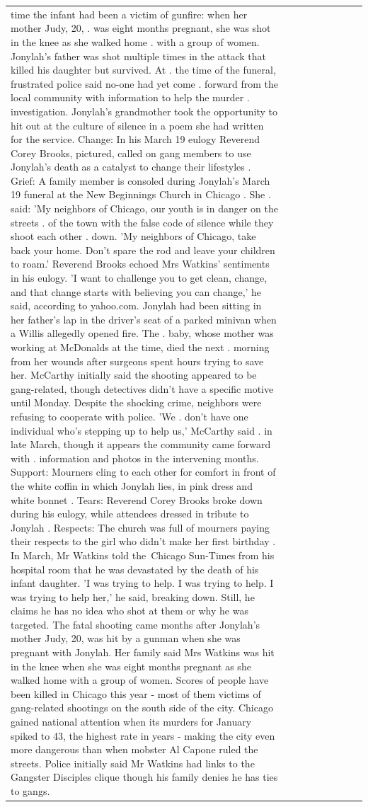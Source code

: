 \begin{table}[H]
\begin{tabular}{lllrlllll}
time the infant had been a victim of gunfire: when her mother Judy, 20, . was eight months pregnant, she was shot in the knee as she walked home . with a group of women. Jonylah's father was shot multiple times in the attack that killed his daughter but survived. At . the time of the funeral, frustrated police said no-one had yet come . forward from the local community with information to help the murder . investigation. Jonylah's grandmother took the opportunity to hit out at the culture of silence in a poem she had written for the service. Change: In his March 19 eulogy Reverend Corey Brooks, pictured, called on gang members to use Jonylah's death as a catalyst to change their lifestyles . Grief: A family member is consoled during Jonylah's March 19 funeral at the New Beginnings Church in Chicago . She . said: 'My neighbors of Chicago, our youth is in danger on the streets . of the town with the false code of silence while they shoot each other . down. 'My neighbors of Chicago, take back your home. Don't spare the rod and leave your children to roam.' Reverend Brooks echoed Mrs Watkins' sentiments in his eulogy. 'I want to challenge you to get clean, change, and that change starts with believing you can change,' he said, according to yahoo.com. Jonylah had been sitting in her father's lap in the driver's seat of a parked minivan when a Willis allegedly opened fire. The . baby, whose mother was working at McDonalds at the time, died the next . morning from her wounds after surgeons spent hours trying to save her. McCarthy initially said the shooting appeared to be gang-related, though detectives didn't have a specific motive until Monday. Despite the shocking crime, neighbors were refusing to cooperate with police. 'We . don't have one individual who's stepping up to help us,' McCarthy said . in late March, though it appears the community came forward with . information and photos in the intervening months. Support: Mourners cling to each other for comfort in front of the white coffin in which Jonylah lies, in pink dress and white bonnet . Tears: Reverend Corey Brooks broke down during his eulogy, while attendees dressed in tribute to Jonylah . Respects: The church was full of mourners paying their respects to the girl who didn't make her first birthday . In March, Mr Watkins told the Chicago Sun-Times from his hospital room that he was devastated by the death of his infant daughter. 'I was trying to help. I was trying to help. I was trying to help her,' he said, breaking down. Still, he claims he has no idea who shot at them or why he was targeted. The fatal shooting came months after Jonylah's mother Judy, 20, was hit by a gunman when she was pregnant with Jonylah. Her family said Mrs Watkins was hit in the knee when she was eight months pregnant as she walked home with a group of women. Scores of people have been killed in Chicago this year - most of them victims of gang-related shootings on the south side of the city. Chicago gained national attention when its murders for January spiked to 43, the highest rate in years - making the city even more dangerous than when mobster Al Capone ruled the streets. Police initially said Mr Watkins had links to the Gangster Disciples clique though his family denies he has ties to gangs. 
\end{tabular}
\end{table}
